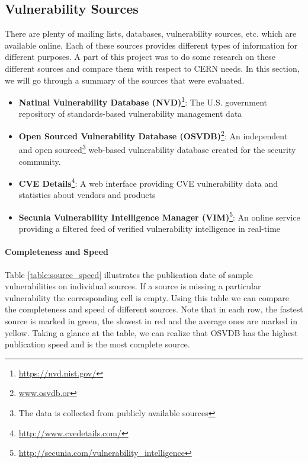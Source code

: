 \subsection{Vulnerability Sources}
\label{vuln_sources}
There are plenty of mailing lists, databases, vulnerability sources, etc. which are available online. Each of these sources provides different types of information for different purposes. A part of this project was to do some research on these different sources and compare them with respect to CERN needs. In this section, we will go through a summary of the sources that were evaluated. 
\begin{itemize}
\item \textbf{Natinal Vulnerability Database (NVD)}\footnote{\url{https://nvd.nist.gov/}}: The U.S. government repository of standards-based vulnerability management data
\item \textbf{Open Sourced Vulnerability Database (OSVDB)}\footnote{\url{www.osvdb.or}}: An independent and open sourced\footnote{The data is collected from publicly available sources} web-based vulnerability database created for the security community. 
\item \textbf{CVE Details}\footnote{\url{http://www.cvedetails.com/}}: A web interface providing CVE vulnerability data and statistics about vendors and products
\item \textbf{Secunia Vulnerability Intelligence Manager (VIM)}\footnote{\url{http://secunia.com/vulnerability_intelligence}}: An online service providing a filtered feed of verified vulnerability intelligence in real-time

\end{itemize}
\paragraph{Completeness and Speed}
Table \ref{table:source_speed} illustrates the publication date of sample vulnerabilities on individual sources. If a source is missing a particular vulnerability the corresponding cell is empty. Using this table we can compare the completeness and speed of different sources. Note that in each row, the fastest source is marked in green, the slowest in red and the average ones are marked in yellow. Taking a glance at the table, we can realize that OSVDB has the highest publication speed and is the most complete source.

